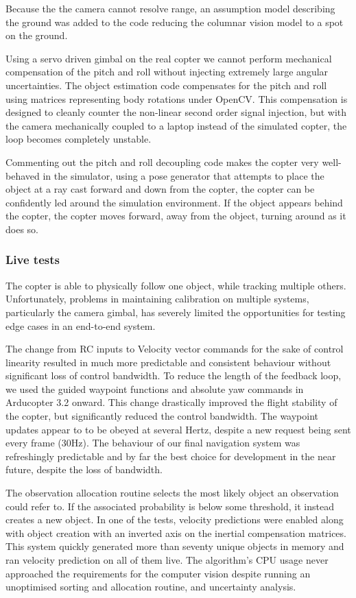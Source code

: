 \documentclass{article}
\newcounter{subsubsubsection}[subsubsection]
\begin{document}
      Because the the camera cannot resolve range, an assumption model describing the ground was added to the code reducing the columnar vision model to a spot on the ground.

      Using a servo driven gimbal on the real copter we cannot perform mechanical compensation of the pitch and roll without injecting extremely large angular uncertainties.
      The object estimation code compensates for the pitch and roll using matrices representing body rotations under OpenCV.
      This compensation is designed to cleanly counter the non-linear second order signal injection, but with the camera mechanically coupled to a laptop instead of the simulated copter, the loop becomes completely unstable.

      Commenting out the pitch and roll decoupling code makes the copter very well-behaved in the simulator, using a pose generator that attempts to place the object at a ray cast forward and down from the copter, the copter can be confidently led around the simulation environment.  If the object appears behind the copter, the copter moves forward, away from the object, turning around as it does so.

    \subsubsection{Live tests}
      The copter is able to physically follow one object, while tracking multiple others.  Unfortunately, problems in maintaining calibration on multiple systems, particularly the camera gimbal, has severely limited the opportunities for testing edge cases in an end-to-end system.

        The change from RC inputs to Velocity vector commands for the sake of control linearity resulted in much more predictable and consistent behaviour without significant loss of control bandwidth.
        To reduce the length of the feedback loop, we used the guided waypoint functions and absolute yaw commands in Arducopter 3.2 onward.  This change drastically improved the flight stability of the copter, but significantly reduced the control bandwidth.  The waypoint updates appear to to be obeyed at several Hertz, despite a new request being sent every frame (30Hz).
        The behaviour of our final navigation system was refreshingly predictable and by far the best choice for development in the near future, despite the loss of bandwidth.
      
        The observation allocation routine selects the most likely object an observation could refer to. If the associated probability is below some threshold, it instead creates a new object.
        In one of the tests, velocity predictions were enabled along with object creation with an inverted axis on the inertial compensation matrices. This system quickly generated more than seventy unique objects in memory and ran velocity prediction on all of them live. The algorithm's CPU usage never approached the requirements for the computer vision despite running an unoptimised sorting and allocation routine, and uncertainty analysis.
\end{document}
